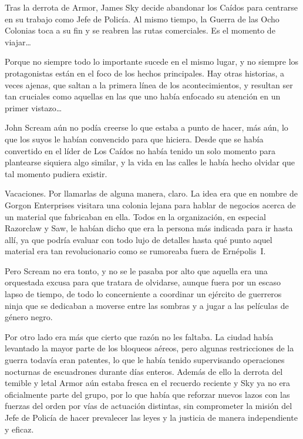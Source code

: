 \begin{prev}
    Tras la derrota de Armor, James Sky decide abandonar los Caídos para centrarse en su trabajo como Jefe de Policía. Al mismo tiempo, la Guerra de las Ocho Colonias toca a su fin y se reabren las rutas comerciales. Es el momento de viajar\dots
\end{prev}

\noindent
Porque no siempre todo lo importante sucede en el mismo lugar, y no siempre los protagonistas están en el foco de los hechos principales. Hay otras historias, a veces ajenas, que saltan a la primera línea de los acontecimientos, y resultan ser tan cruciales como aquellas en las que uno había enfocado su atención en un primer vistazo\dots

\bigskip\noindent
John Scream aún no podía creerse lo que estaba a punto de hacer, más aún, lo que los suyos le habían convencido para que hiciera. Desde que se había convertido en el líder de Los Caídos no había tenido un solo momento para plantearse siquiera algo similar, y la vida en las calles le había hecho olvidar que tal momento pudiera existir.

Vacaciones. Por llamarlas de alguna manera, claro. La idea era que en nombre de Gorgon Enterprises visitara una colonia lejana para hablar de negocios acerca de un material que fabricaban en ella. Todos en la organización, en especial Razorclaw y Saw, le habían dicho que era la persona más indicada para ir hasta allí, ya que podría evaluar con todo lujo de detalles hasta qué punto aquel material era tan revolucionario como se rumoreaba fuera de Ernépolis~I.

Pero Scream no era tonto, y no se le pasaba por alto que aquella era una orquestada excusa para que tratara de olvidarse, aunque fuera por un escaso lapso de tiempo, de todo lo concerniente a coordinar un ejército de guerreros ninja que se dedicaban a moverse entre las sombras y a jugar a las películas de género negro.

Por otro lado era más que cierto que razón no les faltaba. La ciudad había levantado la mayor parte de los bloqueos aéreos, pero algunas restricciones de la guerra todavía eran patentes, lo que le había tenido supervisando operaciones nocturnas de escuadrones durante días enteros. Además de ello la derrota del temible y letal Armor aún estaba fresca en el recuerdo reciente y Sky ya no era oficialmente parte del grupo, por lo que había que reforzar nuevos lazos con las fuerzas del orden por vías de actuación distintas, sin comprometer la misión del Jefe de Policía de hacer prevalecer las leyes y la justicia de manera independiente y eficaz.


